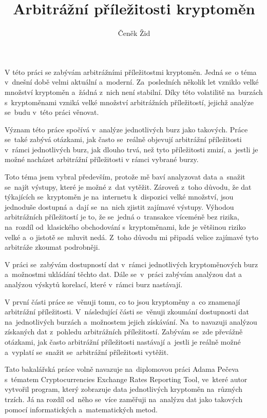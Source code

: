 \documentclass[thesis=B,czech]{FITthesis}[2019/03/21]
\title{Arbitrážní příležitosti kryptoměn}
\author{Čeněk Žid} %
\begin{document}

\begin{introduction}
V této práci se zabývám arbitrážními příležitostmi kryptoměn. Jedná se~o téma v~dnešní době velmi aktuální a~moderní. Za~posledních několik let vzniklo velké množství kryptoměn a~žádná z~nich není stabilní. Díky této volatilitě na~burzách s~kryptoměnami vzniká velké množství arbitrážních příležitostí, jejichž analýze se~budu v~této práci věnovat.

Význam této práce spočívá v~analýze jednotlivých burz jako takových. Práce se~také zabývá otázkami, jak často se~reálně objevují arbitrážní \linebreak příležitosti v~rámci jednotlivých burz, jak dlouho trvá, než tyto příležitosti zmizí, a~jestli je možné nacházet arbitrážní příležitosti v rámci vybrané burzy.

Toto téma jsem vybral především, protože mě baví analyzovat data a~snažit se~najít výstupy, které je možné z~dat vytěžit. Zároveň z~toho důvodu, že dat týkajících se~kryptoměn je na~internetu k~dispozici velké množství, jsou jednoduše dostupná a~dají se~na~nich zjistit zajímavé výstupy. Výhodou arbitrážních příležitostí je to, že se~jedná o~transakce víceméně bez rizika, na~rozdíl od~klasického obchodování s~kryptoměnami, kde je většinou riziko velké a~o jistotě se~mluvit nedá. Z~toho důvodu mi připadá velice zajímavé tyto arbitráže zkoumat podrobněji. 

V práci se~zabývám dostupností dat v~rámci jednotlivých kryptoměnových burz a~možnostmi ukládání těchto dat. Dále se~v~práci zabývám analýzou dat a analýzou výskytů korelací, které v~rámci burz nastávají.

V první části práce se~věnuji tomu, co to jsou kryptoměny a~co znamenají arbitrážní příležitosti. V~následující části se~věnuji zkoumání dostupnosti dat na~jednotlivých burzách a~možnostem jejich získávání. Na~to navazuji analýzou získaných dat z~pohledu arbitrážních příležitostí. Zabývám se~zde převážně otázkami, jak často arbitrážní příležitosti nastávají a~jestli je reálně možné a~vyplatí se~snažit se~arbitrážní příležitosti vytěžit.

Tato bakalářská práce volně navazuje na~diplomovou práci Adama Pečeva s~tématem Cryptocurrencies Exchange Rates Reporting Tool, ve~které autor vytvořil program, který zobrazuje data jednotlivých kryptoměn na~různých trzích. Já na rozdíl od~něho se~více zaměřuji na~analýzu dat jako takových pomocí informatických a~matematických metod.

\end{introduction}
\end{document}
